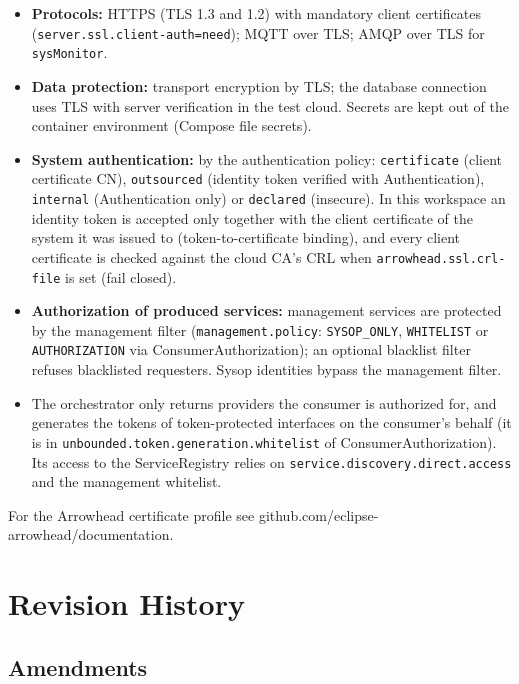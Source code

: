 \documentclass[a4paper]{arrowhead}
\begin{document}
\begin{itemize}
  \item \textbf{Protocols:} HTTPS (TLS 1.3 and 1.2) with mandatory client certificates (\texttt{server.ssl.client-auth=need}); MQTT over TLS; AMQP over TLS for \texttt{sysMonitor}.
  \item \textbf{Data protection:} transport encryption by TLS; the database connection uses TLS with server verification in the test cloud. Secrets are kept out of the container environment (Compose file secrets).
  \item \textbf{System authentication:} by the authentication policy: \texttt{certificate} (client certificate CN), \texttt{outsourced} (identity token verified with Authentication), \texttt{internal} (Authentication only) or \texttt{declared} (insecure). In this workspace an identity token is accepted only together with the client certificate of the system it was issued to (token-to-certificate binding), and every client certificate is checked against the cloud CA's CRL when \texttt{arrowhead.ssl.crl-file} is set (fail closed).
  \item \textbf{Authorization of produced services:} management services are protected by the management filter (\texttt{management.policy}: \texttt{SYSOP\_ONLY}, \texttt{WHITELIST} or \texttt{AUTHORIZATION} via ConsumerAuthorization); an optional blacklist filter refuses blacklisted requesters. Sysop identities bypass the management filter.
  \item The orchestrator only returns providers the consumer is authorized for, and generates the tokens of token-protected interfaces on the consumer's behalf (it is in \texttt{unbounded.\allowbreak{}token.\allowbreak{}generation.\allowbreak{}whitelist} of Consumer\allowbreak{}Authorization). Its access to the ServiceRegistry relies on \texttt{service.\allowbreak{}discovery.\allowbreak{}direct.\allowbreak{}access} and the management whitelist.
\end{itemize}

For the Arrowhead certificate profile see github.com/eclipse-arrowhead/documentation.





\newpage

\section{Revision History}
\subsection{Amendments}
\end{document}
